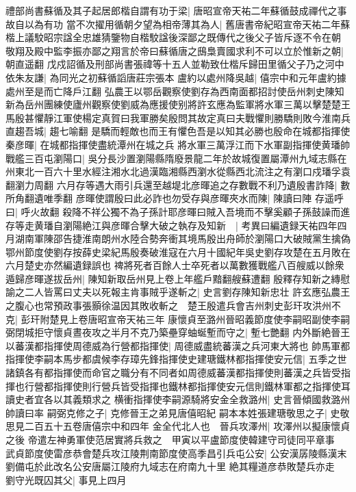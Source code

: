 禮部尚書蘇循及其子起居郎楷自謂有功于梁|{
	唐昭宣帝天祐二年蘇循鼓成禪代之事故自以為有功}
當不次擢用循朝夕望為相帝薄其為人|{
	舊唐書帝紀昭宣帝天祐二年蘇楷上議駮昭宗諡全忠雄猜鑒物自楷駮諡後深鄙之既傳代之後父子皆斥逐不令在朝}
敬翔及殿中監李振亦鄙之翔言於帝曰蘇循唐之䲭梟賣國求利不可以立於惟新之朝|{
	朝直遥翻}
戊戍詔循及刑部尚書張禕等十五人並勒致仕楷斥歸田里循父子乃之河中依朱友謙|{
	為同光之初蘇循謟唐莊宗張本}
盧約以處州降吳越|{
	僖宗中和元年盧約據處州至是而亡降戶江翻}
弘農王以鄂岳觀察使劉存為西南面都招討使岳州刺史陳知新為岳州團練使廬州觀察使劉威為應援使别將許玄應為監軍將水軍三萬以擊楚楚王馬殷甚懼靜江軍使楊定真賀曰我軍勝矣殷問其故定真曰夫戰懼則勝驕則敗今淮南兵直趨吾城|{
	趨七喻翻}
是驕而輕敵也而王有懼色吾是以知其必勝也殷命在城都指揮使秦彦暉|{
	在城都指揮使盡統潭州在城之兵}
將水軍三萬浮江而下水軍副指揮使黄璠帥戰艦三百屯瀏陽口|{
	吳分長沙置瀏陽縣隋廢景龍二年於故城復置屬潭州九域志縣在州東北一百六十里水經注湘水北過漢臨湘縣西瀏水從縣西北流注之有瀏口戍璠孚袁翻瀏力周翻}
六月存等遇大雨引兵還至越堤北彦暉追之存數戰不利乃遺殷書詐降|{
	數所角翻遺唯季翻}
彦暉使謂殷曰此必詐也勿受存與彦暉夾水而陳|{
	陳讀曰陣}
存遥呼曰|{
	呼火故翻}
殺降不祥公獨不為子孫計耶彦暉曰賊入吾境而不擊奚顧子孫鼓譟而進存等走黄璠自瀏陽絶江與彦暉合擊大破之執存及知新　|{
	考異曰編遺録天祐四年四月湖南軍陳邵告捷淮南朗州水陸合勢奔衝其境馬殷出舟師於瀏陽口大破賊黨生擒偽鄂州節度使劉存按薛史梁紀馬殷奏破淮寇在六月十國紀年吳史劉存攻楚在五月敗在六月楚史亦然編遺録誤也}
禆將死者百餘人士卒死者以萬數獲戰艦八百艘威以餘衆遁歸彦暉遂拔岳州|{
	陳知新取岳州見上卷上年艦戶黯翻艘蘇遭翻}
殷釋存知新之縳慰諭之二人皆罵曰丈夫以死報主肯事賊乎遂斬之|{
	史言劉存陳知新忠壮}
許玄應弘農王之腹心也常預政事張顥徐温因其敗收斬之　楚王殷遣兵會吉州刺史彭玕攻洪州不克|{
	彭玕附楚見上卷唐昭宣帝天祐三年}
康懷貞至潞州晉昭義節度使李嗣昭副使李嗣弼閉城拒守懷貞晝夜攻之半月不克乃築壘穿蚰蜒塹而守之|{
	塹七艷翻}
内外斷絶晉王以蕃漢都指揮使周德威為行營都指揮使|{
	周德威盡統蕃漢之兵河東大將也}
帥馬軍都指揮使李嗣本馬步都虞候李存璋先鋒指揮使史建瑭鐵林都指揮使安元信|{
	五季之世諸鎮各有都指揮使而命官之職分有不同者如周德威蕃漢都指揮使則蕃漢之兵皆受指揮也行營都指揮使則行營兵皆受指揮也鐵林都指揮使安元信則鐵林軍都之指揮使耳讀史者宜各以其義類求之}
横衝指揮使李嗣源騎將安金全救潞州|{
	史言晉傾國救潞州帥讀曰率}
嗣弼克修之子|{
	克修晉王之弟見唐僖昭紀}
嗣本本姓張建瑭敬思之子|{
	史敬思見二百五十五卷唐僖宗中和四年}
金全代北人也　晉兵攻澤州|{
	攻澤州以擬康懷貞之後}
帝遣左神勇軍使范居實將兵救之　甲寅以平盧節度使韓建守司徒同平章事　武貞節度使雷彦恭會楚兵攻江陵荆南節度使高季昌引兵屯公安|{
	公安漢孱陵縣漢末劉備屯於此改名公安唐屬江陵府九域志在府南九十里}
絶其糧道彦恭敗楚兵亦走　劉守光既囚其父|{
	事見上四月}
